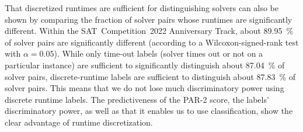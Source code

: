 \documentclass[runningheads]{llncs}
\begin{document}

That discretized runtimes are sufficient for distinguishing solvers can also be shown by comparing the fraction of solver pairs whose runtimes are significantly different.
Within the SAT~Competition~2022 Anniversary Track, about \SI{89.95}{\%} of solver pairs are significantly different (according to a Wilcoxon-signed-rank test with $\alpha = 0.05$).
While only time-out labels (solver times out or not on a particular instance) are sufficient to significantly distinguish about \SI{87.04}{\%} of solver pairs, discrete-runtime labels are sufficient to distinguish about \SI{87.83}{\%} of solver pairs.
This means that we do not lose much discriminatory power using discrete runtime labels.
The predictiveness of the PAR-2 score, the labels' discriminatory power, as well as that it enables us to use classification, show the clear advantage of runtime discretization.
\end{document}

